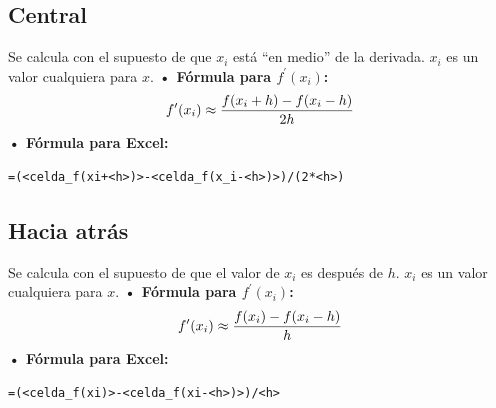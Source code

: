 \documentclass[letterpaper, 12pt]{article}
\begin{document}
\begin{justify}
        \subsection{Central}
        \justify
        Se calcula con el supuesto de que \(x_i\) está ``en medio'' de la derivada. \(x_i\) es un valor cualquiera para \(x\).
        \justify
        \textbf{• Fórmula para \(f^{\prime}(x_i)\):}
        {\large \[f^{\prime}(x_i)\approx{f(x_i+h)-f(x_i-h)\over 2h}\]}
        \justify
        \textbf{• Fórmula para Excel:}
\begin{verbatim}
=(<celda_f(xi+<h>)>-<celda_f(x_i-<h>)>)/(2*<h>)
\end{verbatim}   
        \subsection{Hacia atrás}
        \justify
        Se calcula con el supuesto de que el valor de \(x_i\) es después de \(h\). \(x_i\) es un valor cualquiera para \(x\).
        \justify
        \textbf{• Fórmula para \(f^{\prime}(x_i)\):}
        {\large \[f^{\prime}(x_i)\approx{f(x_i)-f(x_i-h)\over h}\]}
        \justify
        \textbf{• Fórmula para Excel:}
\begin{verbatim}
=(<celda_f(xi)>-<celda_f(xi-<h>)>)/<h>
\end{verbatim}
    \end{justify}
\end{document}
